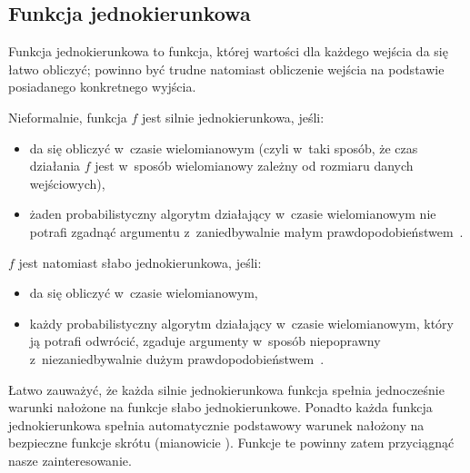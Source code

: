 \documentclass[12pt,a4paper,twoside]{article}
\begin{document}
\subsection{Funkcja jednokierunkowa}
Funkcja jednokierunkowa to funkcja, której wartości dla każdego wejścia da się
łatwo obliczyć; powinno być trudne natomiast obliczenie wejścia na podstawie
posiadanego konkretnego wyjścia.

\noindent Nieformalnie, funkcja $f$ jest silnie jednokierunkowa, jeśli:

\begin{itemize}

    \item da się obliczyć w~czasie wielomianowym (czyli w~taki sposób, że czas
    działania $f$ jest w~sposób wielomianowy zależny od rozmiaru danych
    wejściowych),

    \item żaden probabilistyczny algorytm działający w~czasie wielomianowym nie
    potrafi zgadnąć argumentu z~zaniedbywalnie małym
    prawdopodobieństwem~\cite{one_way_functions}.

\end{itemize}

\noindent $f$ jest natomiast słabo jednokierunkowa, jeśli:

\begin{itemize}

    \item da się obliczyć w~czasie wielomianowym,

    \item każdy probabilistyczny algorytm działający w~czasie wielomianowym,
    który ją potrafi odwrócić, zgaduje argumenty w~sposób niepoprawny
    z~niezaniedbywalnie dużym prawdopodobieństwem~\cite{one_way_functions}.

\end{itemize}

Łatwo zauważyć, że każda silnie jednokierunkowa funkcja spełnia jednocześnie
warunki nałożone na funkcje słabo jednokierunkowe. Ponadto każda funkcja
jednokierunkowa spełnia automatycznie podstawowy warunek nałożony na bezpieczne
funkcje skrótu (mianowicie ). Funkcje te
powinny zatem przyciągnąć nasze zainteresowanie.
\end{document}
